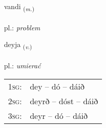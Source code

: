 \documentclass[frontgrid, backgrid]{flacards}\usepackage[]{graphicx}\usepackage[]{xcolor}
\begin{document}
\renewcommand{\flhead}{\vskip5pt \fboxsep=0pt {\small\bfseries\footnotesize Nafnorð | rzeczownik}}
\renewcommand{\fcfoot}{\vskip5pt \fboxsep=0pt \hspace{2pt}{\small\bfseries\footnotesize 1K}}

\renewcommand{\blhead}{\vskip5pt {\small\bfseries\footnotesize Nafnorð | rzeczownik }}
\renewcommand{\bcfoot}{\vskip5pt \hspace{2pt}{\small\bfseries\footnotesize 1K}}


{vandi \small{\textsubscript{(\textit{m.})}} \\[1ex] %
\textphonetic{[vantɪ]} \\
pl.: \emph{problem} \\  [2ex]
\renewcommand*{\arraystretch}{0.8}
}

\renewcommand{\flhead}{\vskip5pt \fboxsep=0pt {\small\bfseries\footnotesize Sagnorð | czasownik}}
\renewcommand{\fcfoot}{\vskip5pt \fboxsep=0pt \hspace{2pt}{\small\bfseries\footnotesize 1K}}

\renewcommand{\blhead}{\vskip5pt {\small\bfseries\footnotesize Sagnorð | czasownik }}
\renewcommand{\bcfoot}{\vskip5pt \hspace{2pt}{\small\bfseries\footnotesize 1K}}


{deyja \small{\textsubscript{(\textit{v.})}} \\[1ex] %
\textphonetic{[teiːja]} \\
pl.: \emph{umierać} \\  [2ex]
\renewcommand*{\arraystretch}{0.8}
\begin{tabular}{p{1cm}l}
\textsc{1sg}: & dey -- dó -- dáið \\ 
\textsc{2sg}: & deyrð -- dóst -- dáið \\ 
\textsc{3sg}: & deyr -- dó -- dáið \\ 
\end{tabular}
}
\end{document}
